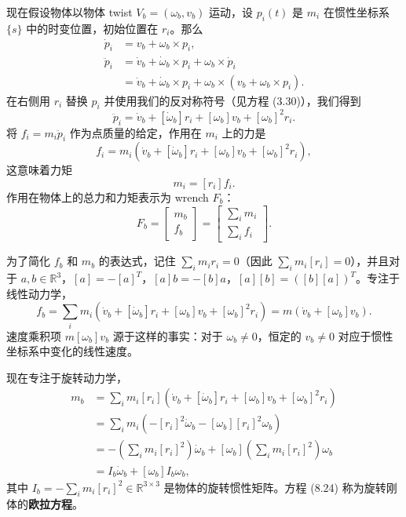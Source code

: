 \documentclass[12pt,a4paper]{article}
\begin{document}
现在假设物体以物体 twist $V_b = (\omega_b, v_b)$ 运动，设 $p_i(t)$ 是 $m_i$ 在惯性坐标系 $\{s\}$ 中的时变位置，初始位置在 $r_i$。那么
\begin{align}
\dot{p}_i &= v_b + \omega_b \times p_i, \\
\ddot{p}_i &= \dot{v}_b + \dot{\omega}_b \times p_i + \omega_b \times \dot{p}_i \nonumber \\
&= \dot{v}_b + \dot{\omega}_b \times p_i + \omega_b \times (v_b + \omega_b \times p_i).
\end{align}
在右侧用 $r_i$ 替换 $p_i$ 并使用我们的反对称符号（见方程 (3.30)），我们得到
\begin{equation}
\ddot{p}_i = \dot{v}_b + [\dot{\omega}_b]r_i + [\omega_b]v_b + [\omega_b]^2 r_i.
\end{equation}
将 $f_i = m_i \ddot{p}_i$ 作为点质量的给定，作用在 $m_i$ 上的力是
\begin{equation}
f_i = m_i(\dot{v}_b + [\dot{\omega}_b]r_i + [\omega_b]v_b + [\omega_b]^2 r_i),
\end{equation}
这意味着力矩
\begin{equation}
m_i = [r_i]f_i.
\end{equation}
作用在物体上的总力和力矩表示为 wrench $F_b$：
\begin{equation}
F_b = \begin{bmatrix} m_b \\ f_b \end{bmatrix} = \begin{bmatrix} \sum_i m_i \\ \sum_i f_i \end{bmatrix}.
\end{equation}

为了简化 $f_b$ 和 $m_b$ 的表达式，记住 $\sum_i m_i r_i = 0$（因此 $\sum_i m_i [r_i] = 0$），并且对于 $a, b \in \mathbb{R}^3$，$[a] = -[a]^T$，$[a]b = -[b]a$，$[a][b] = ([b][a])^T$。专注于线性动力学，
\begin{equation}
f_b = \sum_i m_i(\dot{v}_b + [\dot{\omega}_b]r_i + [\omega_b]v_b + [\omega_b]^2 r_i) = m(\dot{v}_b + [\omega_b]v_b). \label{eq:8.23}
\end{equation}
速度乘积项 $m[\omega_b]v_b$ 源于这样的事实：对于 $\omega_b \neq 0$，恒定的 $v_b \neq 0$ 对应于惯性坐标系中变化的线性速度。

现在专注于旋转动力学，
\begin{align}
m_b &= \sum_i m_i [r_i](\dot{v}_b + [\dot{\omega}_b]r_i + [\omega_b]v_b + [\omega_b]^2 r_i) \nonumber \\
&= \sum_i m_i(-[r_i]^2 \dot{\omega}_b - [\omega_b][r_i]^2 \omega_b) \nonumber \\
&= -\left(\sum_i m_i [r_i]^2\right)\dot{\omega}_b + [\omega_b]\left(\sum_i m_i [r_i]^2\right)\omega_b \nonumber \\
&= I_b \dot{\omega}_b + [\omega_b]I_b \omega_b, \label{eq:8.24}
\end{align}
其中 $I_b = -\sum_i m_i [r_i]^2 \in \mathbb{R}^{3 \times 3}$ 是物体的旋转惯性矩阵。方程 (8.24) 称为旋转刚体的\textbf{欧拉方程}。
\end{document}
